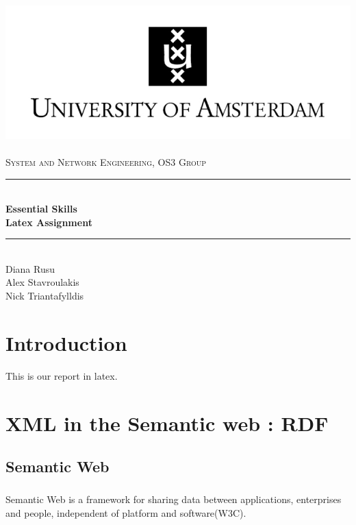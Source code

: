 \documentclass[a4paper,11pt]{report}
\newcommand{\HRule}{\rule{\linewidth}{0.5mm}}
\begin{document}
\begin{titlepage}

\begin{center}

\includegraphics{images/UvA-logo-2a.png}~\\[1cm]

\textsc{\LARGE System and Network Engineering, OS3 Group}\\[1.5cm]

\HRule \\

{ \huge \bfseries Essential Skills\\Latex Assignment}

\HRule \\[1cm]

\large{Diana Rusu} \\
\large{Alex Stavroulakis}\\
\large{Nick Triantafylldis}\\


\end{center}
\end{titlepage}

\tableofcontents

\chapter* {Introduction}

This is our report in latex.

\chapter{XML in the Semantic web : RDF}

\section{Semantic Web}

\paragraph{}Semantic Web is a framework for sharing data between applications, enterprises and people, independent of platform and software(W3C).
\end{document}

